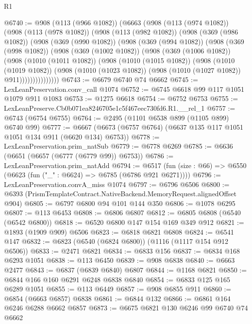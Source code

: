\begin{lexlean}{R1}
\begin{coremodule}
@6740 := @908
    (@113 (@966 @1082))
    (@6663
      (@908
        (@113 (@974 @1082))
        (@908
          (@113 (@978 @1082))
          (@908
            (@113 (@982 @1082))
            (@908
              (@369 (@986 @1082))
              (@908
                (@369 (@990 @1082))
                (@908
                  (@369 (@994 @1082))
                  (@908
                    (@369 (@998 @1082))
                    (@908
                      (@369 (@1002 @1082))
                      (@908
                        (@369 (@1006 @1082))
                        (@908
                          (@1010 (@1011 @1082))
                          (@908
                            (@1010 (@1015 @1082))
                            (@908
                              (@1010 (@1019 @1082))
                              (@908
                                (@1010 (@1023 @1082))
                                (@908 (@1010 (@1027 @1082)) @911)))))))))))))))
@6743 := @6679 @6740 @74 @6662
@6745 := LexLeanPreservation.conv_call @1074
@6752 := @6745 @6618 @99 @117 @1051 @1079 @911 @1083
@6753 := @1275 @6618
@6754 := @6752 @6753
@6755 := LexLeanPreserve.Cb0b071ea8246705e1c5f467eec730fd6.R1.__rel_1
@6757 := @6743 (@6754 @6755)
@6764 := @2495 (@1101 @6538 @899 (@1105 @899) @6740 @99)
@6777 := @6667 (@6673 (@6757 @6764) (@6637 @135 @117 @1051 @1051 @134 @911 (@6620 @134) @6753))
@6778 := LexLeanPreservation.prim_natSub
@6779 := @6778 @6269
@6785 := @6636 (@6651 (@6657 (@6777 (@6779 @99)) @6753))
@6786 := LexLeanPreservation.prim_natAdd
@6794 := @6517 (fun (size : @66) => @6550 (@6623 (fun ("_" : @6624) => @6785 (@6786 @921 @6271))))
@6796 := LexLeanPreservation.convA_miss @1074
@6797 := @6796 @6506
@6800 := @6393 (PrismTemplateContract.NativeBackend.MemoryRequest.alignedOffset @904)
@6805 := @6797 @6800 @94 @101 @144 @350
@6806 := @1078 @6295
@6807 := @113 @6453
@6808 := @6806 @6807
@6812 := @6805 @6808 (@6540 (@6542 @6800))
@6818 := @6520 @6800 @147 @154 @169 @349 @912
@6821 := @1893 (@1909 @909) @6506
@6823 := @6818 @6821 @6808
@6824 := @6541 @147
@6832 := @6823 (@6540 (@6824 @6800)) (@1116 (@1117 @154 @912 @6506))
@6833 := @2471 @6821
@6834 := @6833 @156
@6837 := @6834 @168 @6293 @1051
@6838 := @113 @6450
@6839 := @908 @6838
@6840 := @6663 @2477
@6843 := @6837 (@6839 @6840) @6807
@6844 := @1168 @6821
@6850 := @6844 @166 @160 @6291 @6248 @6838 @6840
@6854 := @6833 @125 @165 @6289 @1051
@6855 := @113 @6449
@6857 := @908 @6855 @911
@6860 := @6854 (@6663 @6857) @6838
@6861 := @6844 @132
@6866 := @6861 @164 @6246 @6288 @6662 @6857
@6873 := @6675 @6821 @130 @6246 @99 @6740 @74 @6662

\end{coremodule}
\end{lexlean}
